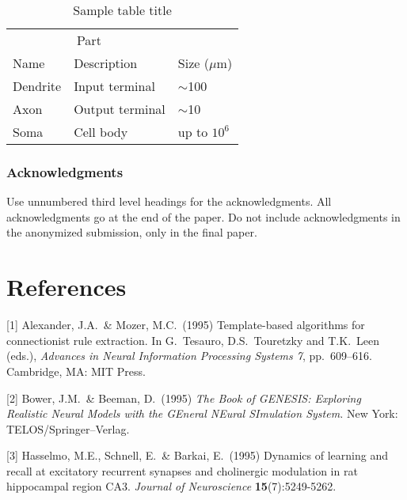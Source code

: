 \documentclass{article}
\begin{document}
\begin{table}
  \caption{Sample table title}
  \label{sample-table}
  \centering
  \begin{tabular}{lll}
    \toprule
    \multicolumn{2}{c}{Part}                   \\
    \cmidrule(r){1-2}
    Name     & Description     & Size ($\mu$m) \\
    \midrule
    Dendrite & Input terminal  & $\sim$100     \\
    Axon     & Output terminal & $\sim$10      \\
    Soma     & Cell body       & up to $10^6$  \\
    \bottomrule
  \end{tabular}
\end{table}

\subsubsection*{Acknowledgments}

Use unnumbered third level headings for the acknowledgments. All
acknowledgments go at the end of the paper. Do not include
acknowledgments in the anonymized submission, only in the final paper.

\newpage
\section*{References}
\small

[1] Alexander, J.A.\ \& Mozer, M.C.\ (1995) Template-based algorithms
for connectionist rule extraction. In G.\ Tesauro, D.S.\ Touretzky and
T.K.\ Leen (eds.), {\it Advances in Neural Information Processing
  Systems 7}, pp.\ 609--616. Cambridge, MA: MIT Press.

[2] Bower, J.M.\ \& Beeman, D.\ (1995) {\it The Book of GENESIS:
  Exploring Realistic Neural Models with the GEneral NEural SImulation
  System.}  New York: TELOS/Springer--Verlag.

[3] Hasselmo, M.E., Schnell, E.\ \& Barkai, E.\ (1995) Dynamics of
learning and recall at excitatory recurrent synapses and cholinergic
modulation in rat hippocampal region CA3. {\it Journal of
  Neuroscience} {\bf 15}(7):5249-5262.
\end{document}
